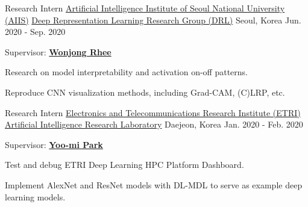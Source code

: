 \documentclass[11pt, a4paper]{cv}
\begin{document}
\begin{cventries}

  \cvexperience
    {Research Intern} %
    {\href{https://aiis.snu.ac.kr/eng/}{Artificial Intelligence Institute of Seoul National University (AIIS)}} %
    {\href{http://drl.snu.ac.kr}{Deep Representation Learning Research Group (DRL)}} %
    {Seoul, Korea} %
    {Jun. 2020 - Sep. 2020} %
    {
      \begin{cvitems} %
        \item {Supervisor: \href{http://drl.snu.ac.kr/?p=13209}{\bfseries\color{graytext} Wonjong Rhee}}
        \item {Research on model interpretability and activation on-off patterns.}
        \item {Reproduce CNN visualization methods, including Grad-CAM, (C)LRP, etc.}
      \end{cvitems}
    }


  \cvexperience
    {Research Intern} %
    {\href{https://etri.re.kr/eng/main/main.etri}{Electronics and Telecommunications Research Institute (ETRI)}} %
    {\href{https://etri.re.kr/eng/sub6/sub6_0101.etri?departCode=10}{Artificial Intelligence Research Laboratory}} %
    {Daejeon, Korea} %
    {Jan. 2020 - Feb. 2020} %
    {
      \begin{cvitems} %
        \item {Supervisor: \href{https://kr.linkedin.com/in/yoomipark-etri}{\bfseries\color{graytext} Yoo-mi Park}}
        \item {Test and debug ETRI Deep Learning HPC Platform Dashboard.}
        \item {Implement AlexNet and ResNet models with DL-MDL to serve as example deep learning models.}
      \end{cvitems}
    }

\end{cventries}
\end{document}

